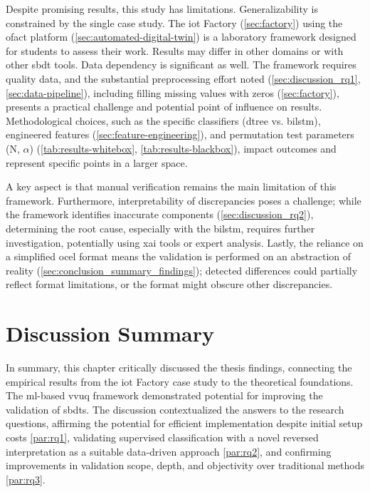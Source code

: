 Despite promising results, this study has limitations. Generalizability is constrained by the single case study. The \gls{iot} Factory (\autoref{sec:factory}) using the \gls{ofact} platform (\autoref{sec:automated-digital-twin}) is a laboratory framework designed for students to assess their work. Results may differ in other domains or with other \gls{sbdt} tools. Data dependency is significant as well. The framework requires quality data, and the substantial preprocessing effort noted (\autoref{sec:discussion_rq1}, \autoref{sec:data-pipeline}), including filling missing values with zeros (\autoref{sec:factory}), presents a practical challenge and potential point of influence on results. Methodological choices, such as the specific classifiers (\gls{dtree} vs. \gls{bilstm}), engineered features (\autoref{sec:feature-engineering}), and permutation test parameters (N, $\alpha$) (\autoref{tab:results-whitebox}, \autoref{tab:results-blackbox}), impact outcomes and represent specific points in a larger space.

A key aspect is that manual verification remains the main limitation of this framework. Furthermore, interpretability of discrepancies poses a challenge; while the framework identifies inaccurate components (\autoref{sec:discussion_rq2}), determining the root cause, especially with the \gls{bilstm}, requires further investigation, potentially using \gls{xai} tools or expert analysis. Lastly, the reliance on a simplified \gls{ocel} format means the validation is performed on an abstraction of reality (\autoref{sec:conclusion_summary_findings}); detected differences could partially reflect format limitations, or the format might obscure other discrepancies.

\section{Discussion Summary}
\label{sec:discussion_summary}

In summary, this chapter critically discussed the thesis findings, connecting the empirical results from the \gls{iot} Factory case study to the theoretical foundations. The \gls{ml}-based \gls{vvuq} framework demonstrated potential for improving the validation of \gls{sbdt}s. The discussion contextualized the answers to the research questions, affirming the potential for efficient implementation despite initial setup costs \autoref{par:rq1}, validating supervised classification with a novel reversed interpretation as a suitable data-driven approach \autoref{par:rq2}, and confirming improvements in validation scope, depth, and objectivity over traditional methods \autoref{par:rq3}.